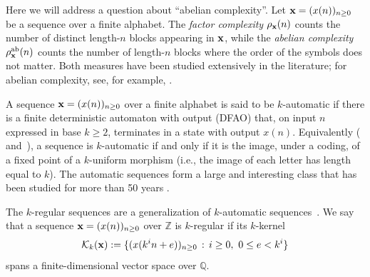 \documentclass[12pt]{article}
\theoremstyle{plain}
\theoremstyle{definition}
\theoremstyle{remark}
\newcommand{\Z}{\mathbb{Z}}
\newcommand{\Q}{\mathbb{Q}}
\numberwithin{equation}{section}
\newcommand{\kernel}{\mathcal{K}}
\def\suchthat{\, : \,}
\begin{document}
\medskip

Here we will address a question about ``abelian complexity''.
Let ${\bf x} = (x(n))_{n \geq 0}$ be a sequence over a finite 
alphabet. The {\it factor complexity} $\rho_{\bf x} (n)$ counts 
the number of distinct length-$n$ blocks appearing in $\bf x$, 
while the {\it abelian complexity} $\rho_{\bf x}^{\rm ab} (n)$ 
counts the number of length-$n$ blocks where the order of the 
symbols does not matter. Both measures have been studied 
extensively in the literature; for abelian complexity, see, for 
example, \cite{Richomme&Saari&Zamboni:2011}.

\medskip

A sequence ${\bf x} = (x(n))_{n \geq 0}$ over a finite alphabet 
is said to be $k$-automatic if there is a finite deterministic automaton 
with output (DFAO) that, on input $n$ expressed in base $k\geq 2$, 
terminates in a state with output $x(n)$. Equivalently (\cite{Cobham:1972} and~\cite[Thm.~6.3.2]{Allouche&Shallit:2003}), a sequence is $k$-automatic
if and only if it is the image, under a coding, of a fixed point of a $k$-uniform morphism (i.e., the image of each letter has length equal to $k$). The automatic sequences form a large and interesting 
class that has been studied for more than 50 years
\cite{Cobham:1972, Allouche&Shallit:2003}.

\medskip

The $k$-regular sequences are a generalization of $k$-automatic 
sequences~\cite{AlloucheShallit,Allouche&Shallit:2003}.  We say that a sequence
${\bf x} = (x(n))_{n \geq 0}$ over $\Z$ is 
$k$-regular if its $k$-kernel
$$
\kernel_k ({\bf x}) := \{ (x(k^i n + e))_{n \geq 0} \suchthat
i \geq 0, \ 0 \leq e < k^i \}
$$
spans a finite-dimensional vector space over $\Q$.  

\medskip
\end{document}
